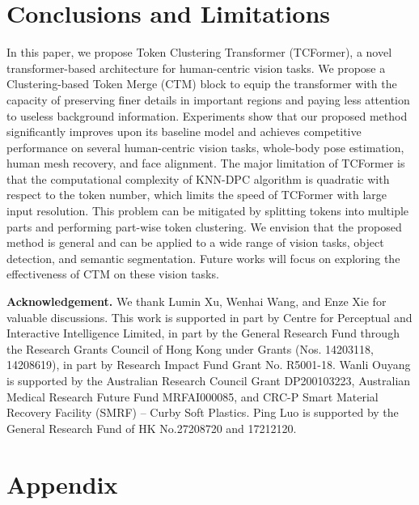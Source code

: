 \documentclass[10pt,twocolumn,letterpaper]{article}
\begin{document}
 
\section{Conclusions and Limitations}

In this paper, we propose Token Clustering Transformer (TCFormer), a novel transformer-based architecture for human-centric vision tasks. We propose a Clustering-based Token Merge (CTM) block to equip the transformer with the capacity of preserving finer details in important regions and paying less attention to useless background information. Experiments show that our proposed method significantly improves upon its baseline model and achieves competitive performance on several human-centric vision tasks, \ie whole-body pose estimation, human mesh recovery, and face alignment.
The major limitation of TCFormer is that the computational complexity of KNN-DPC algorithm is quadratic with respect to the token number, which limits the speed of TCFormer with large input resolution. This problem can be mitigated by splitting tokens into multiple parts and performing part-wise token clustering.
We envision that the proposed method is general and can be applied to a wide range of vision tasks, \eg object detection, and semantic segmentation.
Future works will focus on exploring the effectiveness of CTM on these vision tasks.


\textbf{Acknowledgement.}
We thank Lumin Xu, Wenhai Wang, and Enze Xie for valuable discussions. 
This work is supported in part by Centre for Perceptual and Interactive Intelligence Limited, in part by the General Research Fund through the Research Grants Council of Hong Kong under Grants (Nos. 14203118, 14208619), in part by Research Impact Fund Grant No. R5001-18.
Wanli Ouyang is supported by the Australian Research Council Grant DP200103223, Australian Medical Research Future Fund MRFAI000085, and CRC-P Smart Material Recovery Facility (SMRF) – Curby Soft Plastics. 
Ping Luo is supported by the General Research Fund of HK No.27208720 and 17212120.


{\small


}



\clearpage

\appendix
\section*{\Large Appendix}
\setcounter{table}{0}
\renewcommand{\thetable}{A\arabic{table}}
\setcounter{figure}{0}
\renewcommand{\thefigure}{A\arabic{figure}}
\end{document}
